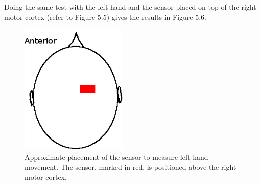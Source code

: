 Doing the same test with the left hand and the sensor placed on top of the right motor cortex (refer to Figure 5.5) gives the results in Figure 5.6.

\begin{figure}[htp]
\centering
\includegraphics[width=2in]{motorsens-left.png}
\caption[Placement of Sensor to Measure Left Hand Movement]{Approximate placement of the sensor to measure left hand movement. The sensor, marked in red, is positioned above the right motor cortex.}
\end{figure}

